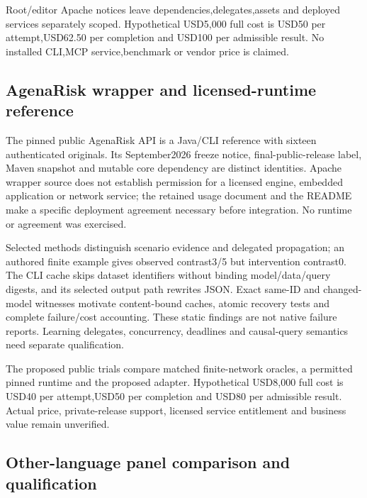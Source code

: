Root/editor Apache notices leave dependencies,delegates,assets and
deployed services separately scoped. Hypothetical USD5,000 full cost is
USD50 per attempt,USD62.50 per completion and USD100 per admissible
result. No installed CLI,MCP service,benchmark or vendor price is
claimed.\citep{exec25_dara_choice}

\hypertarget{agenarisk-wrapper-and-licensed-runtime-reference}{%
\subsection{AgenaRisk wrapper and licensed-runtime
reference}\label{agenarisk-wrapper-and-licensed-runtime-reference}}

The pinned public AgenaRisk API is a Java/CLI reference with sixteen
authenticated originals. Its September2026 freeze notice,
final-public-release label, Maven snapshot and mutable core dependency
are distinct identities. Apache wrapper source does not establish
permission for a licensed engine, embedded application or network
service; the retained usage document and the README make a specific
deployment agreement necessary before integration. No runtime or
agreement was exercised.\citep{exec25_agena_source,exec25_agena_choice}

Selected methods distinguish scenario evidence and delegated
propagation; an authored finite example gives observed contrast3/5 but
intervention contrast0. The CLI cache skips dataset identifiers without
binding model/data/query digests, and its selected output path rewrites
JSON. Exact same-ID and changed-model witnesses motivate content-bound
caches, atomic recovery tests and complete failure/cost accounting.
These static findings are not native failure reports. Learning
delegates, concurrency, deadlines and causal-query semantics need
separate qualification.\citep{exec25_agena_source,exec25_agena_choice}

The proposed public trials compare matched finite-network oracles, a
permitted pinned runtime and the proposed adapter. Hypothetical USD8,000
full cost is USD40 per attempt,USD50 per completion and USD80 per
admissible result. Actual price, private-release support, licensed
service entitlement and business value remain
unverified.\citep{exec25_agena_choice}

\hypertarget{other-language-panel-comparison-and-qualification}{%
\subsection{Other-language panel comparison and
qualification}\label{other-language-panel-comparison-and-qualification}}

